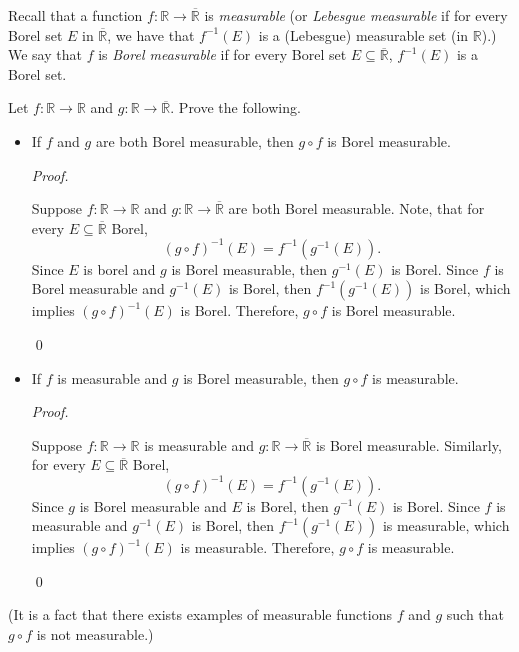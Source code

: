 \documentclass[12pt]{article}
\newenvironment{problem}[2][Problem]{\begin{trivlist}
\item[\hskip \labelsep {\bfseries #1}\hskip \labelsep {\bfseries
#2.}]}{\end{trivlist}}
\newenvironment{sol}
    {\emph{Proof.}
    }
    {
    \qed
    }
\begin{document}
    \begin{problem}{45}
        Recall that a function $f : \mathbb{R} \to \overline{\mathbb{R}}$ is \textit{measurable} (or \textit{Lebesgue measurable} if for every Borel set $E$ in $\overline{\mathbb{R}}$, we have that $f^{-1}(E)$ is a (Lebesgue) measurable set (in $\mathbb{R}$).) We say that $f$ is \textit{Borel measurable} if for every Borel set $E \subseteq \overline{\mathbb{R}}$, $f^{-1}(E)$ is a Borel set.
      
        Let $f : \mathbb{R} \to \mathbb{R}$ and $g : \mathbb{R} \to \overline{\mathbb{R}}$. Prove the following. 
        \begin{itemize}
          \item[(a)] If $f$ and $g$ are both Borel measurable, then $g \circ f$ is Borel measurable.
          
          \begin{sol}
            Suppose $f : \mathbb{R} \to \mathbb{R}$ and $g : \mathbb{R} \to \overline{\mathbb{R}}$ are both Borel measurable. Note, that for every $E \subseteq \overline{\mathbb{R}}$ Borel, 
            $$(g \circ f)^{-1}(E) = f^{-1}(g^{-1}(E)).$$
            Since $E$ is borel and $g$ is Borel measurable, then $g^{-1}(E)$ is Borel. Since $f$ is Borel measurable and $g^{-1}(E)$ is Borel, then $f^{-1}(g^{-1}(E))$ is Borel, which implies $(g \circ f)^{-1}(E)$ is Borel. Therefore, $g \circ f$ is Borel measurable.
          \end{sol}
          
          \item[(b)] If $f$ is measurable and $g$ is Borel measurable, then $g \circ f$ is measurable.
          
          \begin{sol}
            Suppose $f : \mathbb{R} \to \mathbb{R}$ is measurable and $g : \mathbb{R} \to \overline{\mathbb{R}}$ is Borel measurable. Similarly, for every $E \subseteq \overline{\mathbb{R}}$ Borel, 
            $$(g \circ f)^{-1}(E) = f^{-1}(g^{-1}(E)).$$
            Since $g$ is Borel measurable and $E$ is Borel, then $g^{-1}(E)$ is Borel. Since $f$ is measurable and $g^{-1}(E)$ is Borel, then $f^{-1}(g^{-1}(E))$ is measurable, which implies $(g \circ f)^{-1}(E)$ is measurable. Therefore, $g \circ f$ is measurable.
          \end{sol}
        \end{itemize}
        (It is a fact that there exists examples of measurable functions $f$ and $g$ such that $g \circ f$ is not measurable.)
      \end{problem}
      
\end{document}
